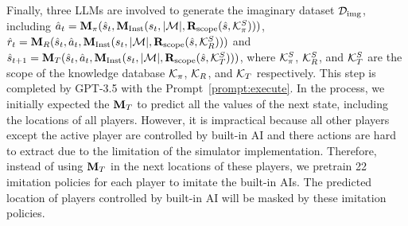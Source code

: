 Finally, three LLMs are involved to generate the imaginary dataset $\mathcal{D}_{\rm img}$, including $\hat a_{t}=\mathbf{M}_{\pi}(\hat s_t, \mathbf{M}_{\rm Inst}(s_t, |\mathcal{M}|, \mathbf{R}_{\rm scope}({\hat s}, \mathcal{K}_{\pi}^S)))$, $\hat r_{t}=\mathbf{M}_{R}(\hat s_t, \hat a_t, \mathbf{M}_{\rm Inst}(s_t, |\mathcal{M}|, \mathbf{R}_{\rm scope}({\hat s}, \mathcal{K}_{R}^S)))$ and~$\hat s_{t+1}=\mathbf{M}_{T}(\hat s_t, \hat a_{t}, \mathbf{M}_{\rm Inst}(s_t, |\mathcal{M}|, \mathbf{R}_{\rm scope}({\hat s}, \mathcal{K}_{T}^S)))$, where $\mathcal{K}_{\pi}^S$, $\mathcal{K}_{R}^S$, and $\mathcal{K}_{T}^S$ are the scope of the knowledge database $\mathcal{K}_{\pi}$, $\mathcal{K}_{R}$, and $\mathcal{K}_{T}$ respectively. This step is completed by GPT-3.5 with the Prompt~\ref{prompt:execute}.  In the process, we initially expected the $\mathbf{M}_{T}$ to predict all the values of the next state, including the locations of all players. However, it is impractical because all other players except the active player are controlled by built-in AI and there actions are hard to extract due to the limitation of the simulator implementation. Therefore, instead of using $\mathbf{M}_{T}$ in the next locations of these players, we pretrain 22 imitation policies for each player to imitate the built-in AIs. The predicted location of players controlled by built-in AI will be masked by these imitation policies.



